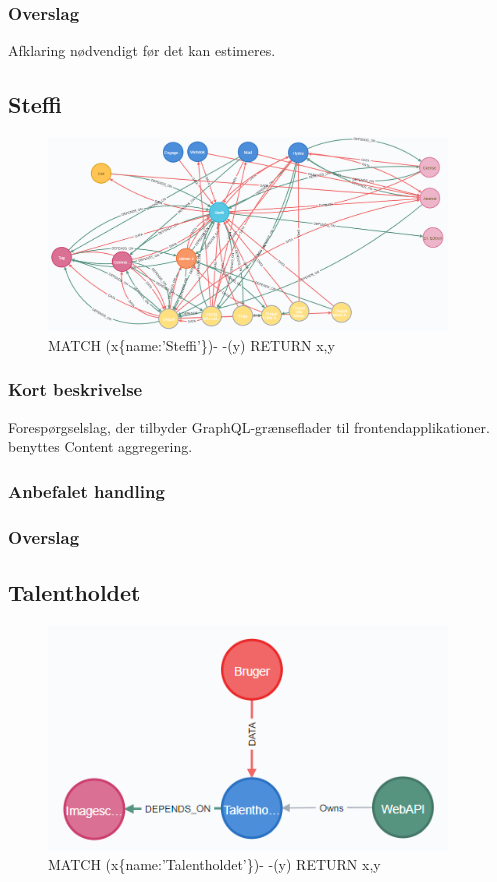 \documentclass{article}
\begin{document}
\subsubsection{Overslag}
Afklaring nødvendigt før det kan estimeres.


\subsection{Steffi}
\begin{figure}[h]
\includegraphics[width=300pt]{Steffi.PNG}
\caption{MATCH (x\{name:'Steffi'\})- -(y) RETURN x,y}
\end{figure}
\subsubsection{Kort beskrivelse}
Forespørgselslag, der tilbyder GraphQL-grænseflader til frontendapplikationer.
benyttes Content aggregering.
\subsubsection{Anbefalet handling}
\subsubsection{Overslag}


\subsection{Talentholdet}
\begin{figure}[h]
\includegraphics[width=300pt]{Talentholdet.PNG}
\caption{MATCH (x\{name:'Talentholdet'\})- -(y) RETURN x,y}
\end{figure}
\end{document}
